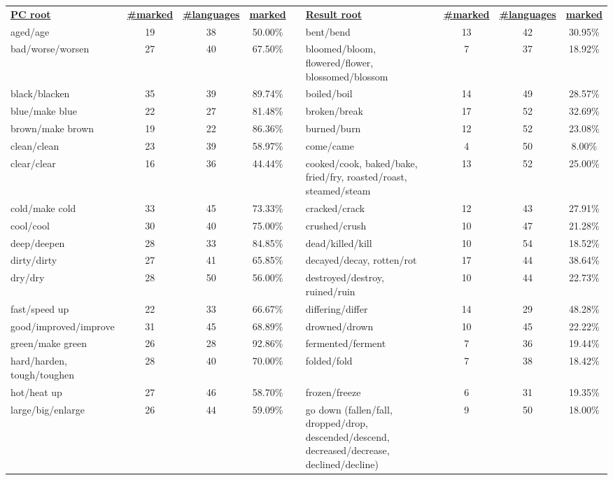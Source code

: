 \begin{tabular}{p{3cm}ccccp{3cm}ccc}
\underline{\textbf{PC root}} & \underline{\textbf{\#marked}} & \underline{\textbf{\#languages}} & \underline{\textbf{marked}} & & \underline{\textbf{Result root}} & \underline{\textbf{\#marked}} & \underline{\textbf{\#languages}} & \underline{\textbf{marked}} \\
aged/age & 19 & 38 & 50.00\% & & bent/bend & 13 & 42 & 30.95\% \\
bad/worse/worsen & 27 & 40 & 67.50\% & & bloomed/bloom, flowered/flower, blossomed/blossom & 7 & 37 & 18.92\% \\
black/blacken & 35 & 39 & 89.74\% & & boiled/boil & 14 & 49 & 28.57\% \\
blue/make blue & 22 & 27 & 81.48\% & & broken/break & 17 & 52 & 32.69\% \\
brown/make brown & 19 & 22 & 86.36\% & & burned/burn & 12 & 52 & 23.08\% \\
clean/clean & 23 & 39 & 58.97\% & & come/came & 4 & 50 & 8.00\% \\
clear/clear & 16 & 36 & 44.44\% & & cooked/cook, baked/bake, fried/fry, roasted/roast, steamed/steam & 13 & 52 & 25.00\% \\
cold/make cold & 33 & 45 & 73.33\% & & cracked/crack & 12 & 43 & 27.91\% \\
cool/cool & 30 & 40 & 75.00\% & & crushed/crush & 10 & 47 & 21.28\% \\
deep/deepen & 28 & 33 & 84.85\% & & dead/killed/kill & 10 & 54 & 18.52\% \\
dirty/dirty & 27 & 41 & 65.85\% & & decayed/decay, rotten/rot & 17 & 44 & 38.64\% \\
dry/dry & 28 & 50 & 56.00\% & & destroyed/destroy, ruined/ruin & 10 & 44 & 22.73\% \\
fast/speed up & 22 & 33 & 66.67\% & & differing/differ & 14 & 29 & 48.28\% \\
good/improved/improve & 31 & 45 & 68.89\% & & drowned/drown & 10 & 45 & 22.22\% \\
green/make green & 26 & 28 & 92.86\% & & fermented/ferment & 7 & 36 & 19.44\% \\
hard/harden, tough/toughen & 28 & 40 & 70.00\% & & folded/fold & 7 & 38 & 18.42\% \\
hot/heat up & 27 & 46 & 58.70\% & & frozen/freeze & 6 & 31 & 19.35\% \\
large/big/enlarge & 26 & 44 & 59.09\% & & go down (fallen/fall, dropped/drop, descended/descend, decreased/decrease, declined/decline) & 9 & 50 & 18.00\% \\

\end{tabular}
